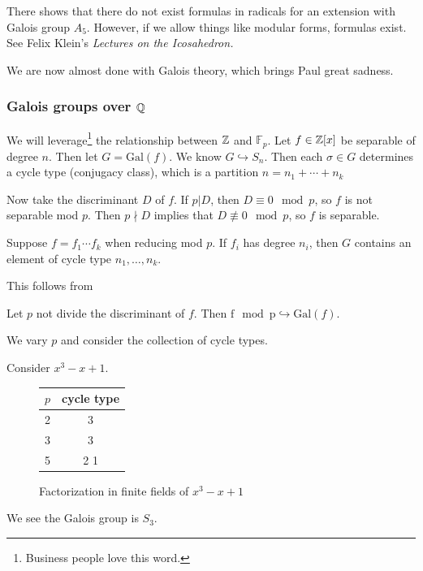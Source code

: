 \documentclass[10pt, twoside]{article}
\newcommand{\F}{\mathbb{F}}
\begin{document}
        \begin{rmk}
            There shows that there do not exist formulas in radicals for an extension with Galois group $A_5$. However, if we allow things like modular forms, formulas exist. See Felix Klein's \emph{Lectures on the Icosahedron.}
        \end{rmk}
        
        We are now almost done with Galois theory, which brings Paul great sadness.
        \subsubsection{Galois groups over $\mathbb{Q}$}
        We will leverage\footnote{Business people love this word.} the relationship between $\mathbb{Z}$ and $\F_p$. Let $f \in \mathbb{Z}[x]$ be separable of degree $n$. Then let $G = \mathrm{Gal}(f)$. We know $G \hookrightarrow S_n$. Then each $\sigma \in G$ determines a cycle type (conjugacy class), which is a partition $n = n_1 + \cdots + n_k$ 
        
        Now take the discriminant $D$ of $f$. If $p | D$, then $D \equiv 0 \mod p$, so $f$ is not separable mod $p$. Then $p \nmid D$ implies that $D \not\equiv 0 \mod p$, so $f$ is separable.

        \begin{prop}
            Suppose $f = f_1 \cdots f_k$ when reducing mod $p$. If $f_i$ has degree $n_i$, then $G$ contains an element of cycle type $n_1, \ldots, n_k$.
        \end{prop}

        This follows from 
        \begin{thm}
            Let $p$ not divide the discriminant of $f$. Then $\mathrm{f \mod p} \hookrightarrow \mathrm{Gal}(f)$.
        \end{thm}

        We vary $p$ and consider the collection of cycle types.
        
        \begin{exm}
            Consider $x^3-x+1$.
            \begin{figure}[H]
                \begin{center}
                    \begin{tabular}{cc}
                        \toprule
                        $p$ & cycle type \\
                        \midrule
                        2 & 3 \\
                        3 & 3 \\
                        5 & 2 1 \\
                        \bottomrule
                    \end{tabular}
                \end{center}
                \caption{Factorization in finite fields of $x^3-x+1$}%
                \label{fig:factorization-finite-fields}
            \end{figure}
            We see the Galois group is $S_3$.
        \end{exm}
\end{document}
